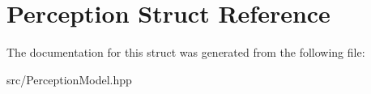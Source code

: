 \hypertarget{structPerception}{}\section{Perception Struct Reference}
\label{structPerception}


The documentation for this struct was generated from the following file\+:\begin{DoxyCompactItemize}
\item 
src/Perception\+Model.\+hpp\end{DoxyCompactItemize}
